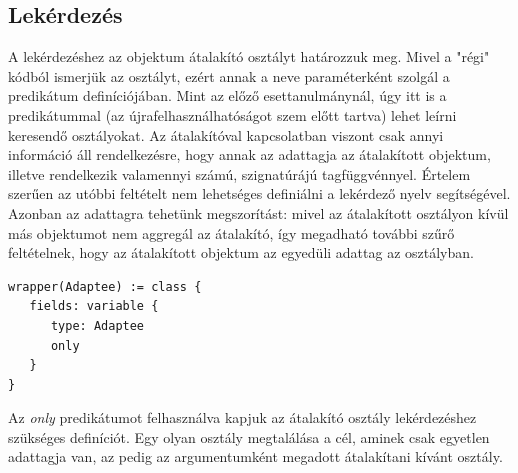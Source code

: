 \documentclass[a4paper,12pt]{report}
\begin{document}
\subsection{Lekérdezés}
A lekérdezéshez az objektum átalakító osztályt határozzuk meg. Mivel a "régi" kódból ismerjük az osztályt, ezért annak a neve paraméterként szolgál a predikátum definíciójában. Mint az előző esettanulmánynál, úgy itt is a predikátummal (az újrafelhasználhatóságot szem előtt tartva) lehet leírni keresendő osztályokat. Az átalakítóval kapcsolatban viszont csak annyi információ áll rendelkezésre, hogy annak az adattagja az átalakított objektum, illetve rendelkezik valamennyi számú, szignatúrájú tagfüggvénnyel. Értelem szerűen az utóbbi feltételt nem lehetséges definiálni a lekérdező nyelv segítségével. Azonban az adattagra tehetünk megszorítást: mivel az átalakított osztályon kívül más objektumot nem aggregál az átalakító, így megadható további szűrő feltételnek, hogy az átalakított objektum az egyedüli adattag az osztályban.
\begin{verbatim}
wrapper(Adaptee) := class {
   fields: variable { 
      type: Adaptee
      only
   }
}
\end{verbatim}
\par Az \textit{only} predikátumot felhasználva kapjuk az átalakító osztály lekérdezéshez szükséges definíciót. Egy olyan osztály megtalálása a cél, aminek csak egyetlen adattagja van, az pedig az argumentumként megadott átalakítani kívánt osztály.
\end{document}
